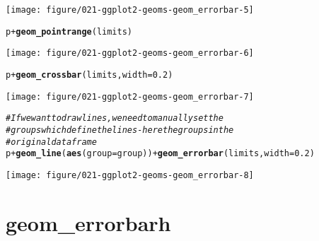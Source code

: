 \documentclass[a4paper,titlepage]{tufte-handout}\usepackage[]{graphicx}\usepackage[]{color}
\makeatletter
\def\maxwidth{ %
  \ifdim\Gin@nat@width>\linewidth
    \linewidth
  \else
    \Gin@nat@width
  \fi
}
\newcommand{\hlnum}[1]{\textcolor[rgb]{0.686,0.059,0.569}{#1}}%
\newcommand{\hlcom}[1]{\textcolor[rgb]{0.678,0.584,0.686}{\textit{#1}}}%
\newcommand{\hlopt}[1]{\textcolor[rgb]{0,0,0}{#1}}%
\newcommand{\hlstd}[1]{\textcolor[rgb]{0.345,0.345,0.345}{#1}}%
\newcommand{\hlkwc}[1]{\textcolor[rgb]{0.333,0.667,0.333}{#1}}%
\newcommand{\hlkwd}[1]{\textcolor[rgb]{0.737,0.353,0.396}{\textbf{#1}}}%
\newenvironment{kframe}{%
 \def\at@end@of@kframe{}%
 \ifinner\ifhmode%
  \def\at@end@of@kframe{\end{minipage}}%
  \begin{minipage}{\columnwidth}%
 \fi\fi%
 \def\FrameCommand##1{\hskip\@totalleftmargin \hskip-\fboxsep
 \colorbox{shadecolor}{##1}\hskip-\fboxsep
     \hskip-\linewidth \hskip-\@totalleftmargin \hskip\columnwidth}%
 \MakeFramed {\advance\hsize-\width
   \@totalleftmargin\z@ \linewidth\hsize
   \@setminipage}}%
 {\par\unskip\endMakeFramed%
 \at@end@of@kframe}
\newenvironment{knitrout}{}{} %
\makeatother
\begin{document}
\begin{knitrout}
\begin{kframe}
\end{kframe}
\texttt{[image: figure/021-ggplot2-geoms-geom\_errorbar-5]} 
\begin{kframe}\begin{alltt}
\hlstd{p} \hlopt{+} \hlkwd{geom_pointrange}\hlstd{(limits)}
\end{alltt}
\end{kframe}
\texttt{[image: figure/021-ggplot2-geoms-geom\_errorbar-6]} 
\begin{kframe}\begin{alltt}
\hlstd{p} \hlopt{+} \hlkwd{geom_crossbar}\hlstd{(limits,} \hlkwc{width}\hlstd{=}\hlnum{0.2}\hlstd{)}
\end{alltt}
\end{kframe}
\texttt{[image: figure/021-ggplot2-geoms-geom\_errorbar-7]} 
\begin{kframe}\begin{alltt}
\hlcom{# If we want to draw lines, we need to manually set the}
\hlcom{# groups which define the lines - here the groups in the}
\hlcom{# original dataframe}
\hlstd{p} \hlopt{+} \hlkwd{geom_line}\hlstd{(}\hlkwd{aes}\hlstd{(}\hlkwc{group}\hlstd{=group))} \hlopt{+} \hlkwd{geom_errorbar}\hlstd{(limits,} \hlkwc{width}\hlstd{=}\hlnum{0.2}\hlstd{)}
\end{alltt}
\end{kframe}
\texttt{[image: figure/021-ggplot2-geoms-geom\_errorbar-8]} 

\end{knitrout}


\section{geom\_errorbarh}
\end{document}
